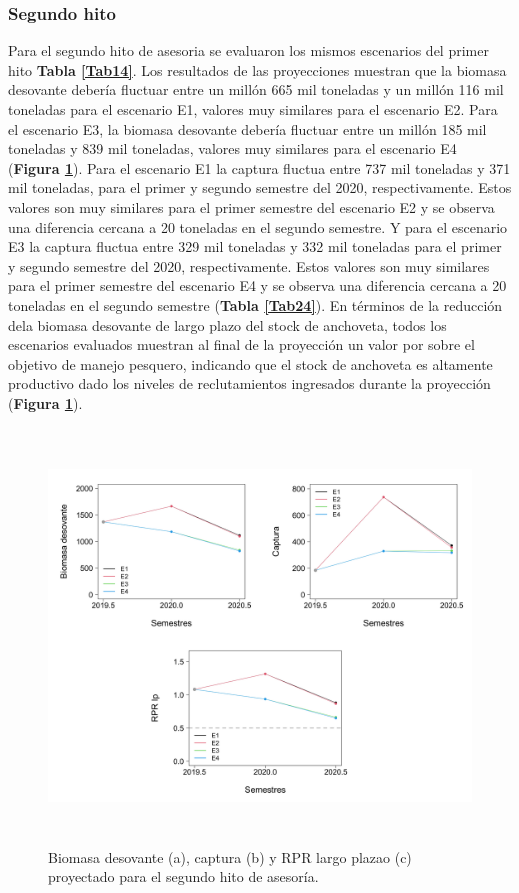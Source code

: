 \documentclass[letter,11pt]{article}
\begin{document}
\pagebreak


\subsubsection{Segundo hito}

\quad

Para el segundo hito de asesoria se evaluaron los mismos escenarios del
primer hito \textbf{Tabla \ref{Tab14}}. Los resultados de las
proyecciones muestran que la biomasa desovante deber\'ia fluctuar entre un
mill\'on 665 mil toneladas y un mill\'on 116 mil toneladas para el escenario
E1, valores muy similares para el escenario E2. Para el escenario E3, la
biomasa desovante deber\'ia fluctuar entre un mill\'on 185 mil toneladas y
839 mil toneladas, valores muy similares para el escenario E4
(\textbf{Figura \ref{Fig22}}). Para el escenario E1 la captura fluctua
entre 737 mil toneladas y 371 mil toneladas, para el primer y segundo
semestre del 2020, respectivamente. Estos valores son muy similares para
el primer semestre del escenario E2 y se observa una diferencia cercana
a 20 toneladas en el segundo semestre. Y para el escenario E3 la captura
fluctua entre 329 mil toneladas y 332 mil toneladas para el primer y
segundo semestre del 2020, respectivamente. Estos valores son muy
similares para el primer semestre del escenario E4 y se observa una
diferencia cercana a 20 toneladas en el segundo semestre
(\textbf{Tabla \ref{Tab24}}). En t\'erminos de la reducci\'on dela biomasa
desovante de largo plazo del stock de anchoveta, todos los escenarios
evaluados muestran al final de la proyecci\'on un valor por sobre el
objetivo de manejo pesquero, indicando que el stock de anchoveta es
altamente productivo dado los niveles de reclutamientos ingresados
durante la proyecci\'on (\textbf{Figura \ref{Fig22}}).\\

\vspace{0.5cm}
\begin{figure}[htb!]
 \centering
 \includegraphics[width=13cm,height=11cm]{Figuras/figura22.pdf}
 \caption{Biomasa desovante (a), captura (b) y RPR largo plazao (c) proyectado para el segundo hito de asesor\'ia.}
 \label{Fig22}
\end{figure}
\end{document}
